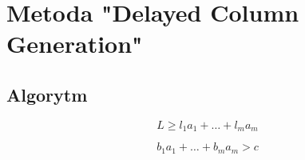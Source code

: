 \newcommand{\mf}[1]{\textbf{\textit{#1}}}
\newcommand{\tsub}[1]{\textsubscript{#1}}
\newcommand{\tsuper}[1]{\textsuperscript{#1}}

\section{Metoda "Delayed Column Generation"} 

\subsection{Algorytm}

\begin{equation}\label{length_eq}
L \ge l_1a_1+\dots+l_ma_m
\end{equation}

\begin{equation}\label{cost_eq}
b_1a_1+\dots+b_ma_m > c
\end{equation}


